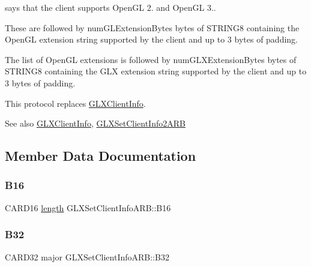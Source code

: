 says that the client supports Open\+GL 2. and Open\+GL 3..

These are followed by {\ttfamily num\+G\+L\+Extension\+Bytes} bytes of {\ttfamily S\+T\+R\+I\+N\+G8} containing the Open\+GL extension string supported by the client and up to 3 bytes of padding.

The list of Open\+GL extensions is followed by {\ttfamily num\+G\+L\+X\+Extension\+Bytes} bytes of {\ttfamily S\+T\+R\+I\+N\+G8} containing the G\+LX extension string supported by the client and up to 3 bytes of padding.

This protocol replaces {\ttfamily \hyperlink{struct_g_l_x_client_info}{G\+L\+X\+Client\+Info}}.

\begin{DoxySeeAlso}{See also}
\hyperlink{struct_g_l_x_client_info}{G\+L\+X\+Client\+Info}, \hyperlink{struct_g_l_x_set_client_info2_a_r_b}{G\+L\+X\+Set\+Client\+Info2\+A\+RB} 
\end{DoxySeeAlso}


\subsection{Member Data Documentation}
\mbox{\label{struct_g_l_x_set_client_info_a_r_b_a5a7a613b3975dfeff7e06bba4bab76fd}} 
\subsubsection{\texorpdfstring{B16}{B16}}
{\footnotesize\ttfamily C\+A\+R\+D16 \hyperlink{glcorearb_8h_ab9c919755bde3b34349e23a32b4e0fa7}{length} G\+L\+X\+Set\+Client\+Info\+A\+R\+B\+::\+B16}

\mbox{\label{struct_g_l_x_set_client_info_a_r_b_ae2bf01e003c062f6f0f36a462f544427}} 
\subsubsection{\texorpdfstring{B32}{B32}\hspace{0.1cm}{\footnotesize\ttfamily [1/5]}}
{\footnotesize\ttfamily C\+A\+R\+D32 major G\+L\+X\+Set\+Client\+Info\+A\+R\+B\+::\+B32}

